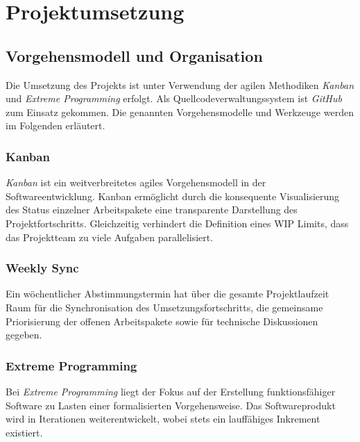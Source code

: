 \newpage

\section{Projektumsetzung}
\label{projektumsetzung}

\subsection{Vorgehensmodell und Organisation}
\label{Vorgehensmodelle_und_organisation}

Die Umsetzung des Projekts ist unter Verwendung der agilen Methodiken \emph{Kanban} und \emph{Extreme Programming} erfolgt. Als Quellcodeverwaltungssystem ist \emph{GitHub} zum Einsatz gekommen. Die genannten Vorgehensmodelle und Werkzeuge werden im Folgenden erläutert.

\subsubsection{Kanban}
\label{kanban}

\emph{Kanban} ist ein weitverbreitetes agiles Vorgehensmodell in der Softwareentwicklung. Kanban ermöglicht durch die konsequente Visualisierung des Status einzelner Arbeitspakete eine transparente Darstellung des Projektfortschritts. Gleichzeitig verhindert die Definition eines \ac{WIP} Limits, dass das Projektteam zu viele Aufgaben parallelisiert. %

\subsubsection{Weekly Sync}
\label{weekly_sync}

Ein wöchentlicher Abstimmungstermin hat über die gesamte Projektlaufzeit Raum für die Synchronisation des Umsetzungsfortschritts, die gemeinsame Priorisierung der offenen Arbeitspakete sowie für technische Diskussionen gegeben.

\subsubsection{Extreme Programming}
\label{extreme_programming}

Bei \emph{Extreme Programming} liegt der Fokus auf der Erstellung funktionsfähiger Software zu Lasten einer formalisierten Vorgehensweise. Das Softwareprodukt wird in Iterationen weiterentwickelt, wobei stets ein lauffähiges Inkrement existiert.%

